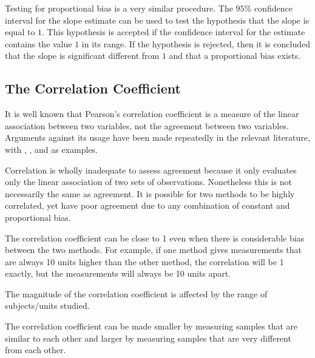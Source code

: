 \documentclass[12pt, a4paper]{report}
\theoremstyle{plain}
\theoremstyle{definition}
\theoremstyle{remark}
\begin{document}
	Testing for proportional bias is a very similar procedure. The
	$95\%$ confidence interval for the slope estimate can be used to
	test the hypothesis that the slope is equal to $1$. This
	hypothesis is accepted if the confidence interval for the estimate
	contains the value $1$ in its range. If the hypothesis is
	rejected, then it is concluded that the slope is significant
	different from $1$ and that a proportional bias exists.
	
	
	
	
	

	\subsection{The Correlation Coefficient}
	
	It is well known that Pearson's correlation coefficient is a measure of the linear association between two variables, not the agreement between two variables. Arguments against its usage have been made repeatedly in the relevant literature,  with \citet{BA83}, \citet{BA86}, \citet{BA2003} and \citet{giavarina2015understanding} as examples.
	
	
	Correlation is wholly inadequate to assess agreement because it only evaluates only the linear association of two sets of observations.  Nonetheless this is not necessarily the same as agreement. It is possible for two methods to
	be highly correlated, yet have poor agreement due to any combination of constant and proportional bias.	
	
	The correlation coefficient can be close to 1 even when there is considerable bias between the two methods. For example, if one method gives measurements that are always 10 units higher than the other method, the correlation will be 1 exactly, but the measurements will always be 10 units apart.
	
	The magnitude of the correlation coefficient is affected by the range of subjects/units studied. 
	
	The correlation coefficient can be made smaller by measuring samples that are similar to each other and larger by measuring samples that are very different from each other. 
	
\end{document}
